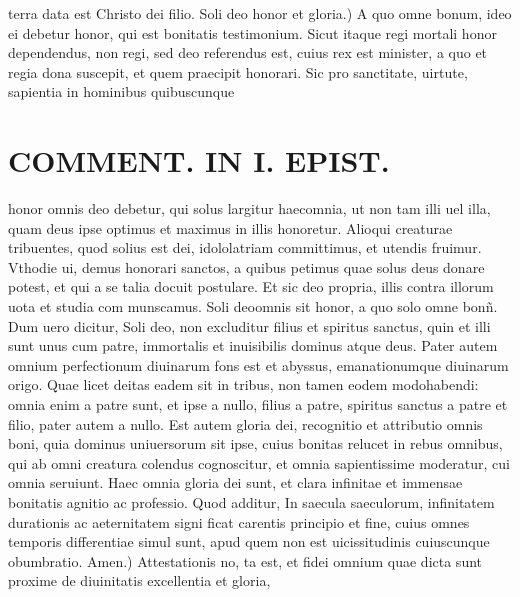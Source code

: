 \documentclass{article}
\begin{document}
\begin{pages}
terra data est Christo dei filio. Soli deo honor et gloria.) A quo omne bonum, ideo ei debetur honor, qui est bonitatis testimonium. Sicut itaque regi mortali honor dependendus, non regi, sed deo referendus est, cuius rex est minister, a quo et regia dona suscepit, et quem praecipit honorari. Sic pro sanctitate, uirtute, sapientia in hominibus quibuscunque   \pend
\section*{COMMENT. IN I. EPIST. }
\marginpar{[ p.478 ]}\pstart honor omnis deo debetur, qui solus largitur haecomnia, ut non tam illi uel illa, quam deus ipse optimus et maximus in illis honoretur. Alioqui creaturae tribuentes, quod solius est dei, idololatriam committimus, et utendis fruimur. Vthodie ui, demus honorari sanctos, a quibus petimus quae solus deus donare potest, et qui a se talia docuit postulare. Et sic deo propria, illis contra illorum uota et studia com munscamus. Soli deoomnis sit honor, a quo solo omne bonñ. Dum uero dicitur, Soli deo, non excluditur filius et spiritus sanctus, quin et illi sunt unus cum patre, immortalis et inuisibilis dominus atque deus. Pater autem omnium perfectionum diuinarum fons est et abyssus, emanationumque diuinarum origo. Quae licet deitas eadem sit in tribus, non tamen eodem modohabendi: omnia enim a patre sunt, et ipse a nullo, filius a patre, spiritus sanctus a patre et filio, pater autem a nullo. Est autem gloria dei, recognitio et attributio omnis boni, quia dominus uniuersorum sit ipse, cuius bonitas relucet in rebus omnibus, qui ab omni creatura colendus cognoscitur, et omnia sapientissime moderatur, cui omnia seruiunt. Haec omnia gloria dei sunt, et clara infinitae et immensae bonitatis agnitio ac professio. Quod additur, In saecula saeculorum, infinitatem durationis ac aeternitatem signi ficat carentis principio et fine, cuius omnes temporis differentiae simul sunt, apud quem non est uicissitudinis cuiuscunque obumbratio. Amen.) Attestationis no, ta est, et fidei omnium quae dicta sunt proxime de diuinitatis excellentia et gloria,  \pend
{}
{}

\end{pages}
\end{document}
